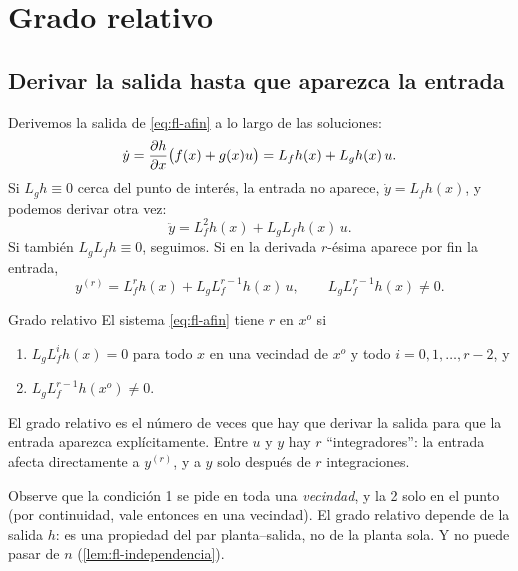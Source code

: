 \section{Grado relativo}
\label{sec:fl-grado}

\subsection{Derivar la salida hasta que aparezca la entrada}

Derivemos la salida de \eqref{eq:fl-afin} a lo largo de las soluciones:
\[
  \dot y=\frac{\partial h}{\partial x}\bigl(f(x)+g(x)u\bigr)=L_fh(x)+L_gh(x)\,u .
\]
Si $L_gh\equiv0$ cerca del punto de interés, la entrada no aparece, $\dot y=L_fh(x)$, y podemos derivar otra vez:
\[
  \ddot y=L_f^2h(x)+L_gL_fh(x)\,u .
\]
Si también $L_gL_fh\equiv0$, seguimos. Si en la derivada $r$-ésima aparece por fin la entrada,
\begin{equation}
  y^{(r)}=L_f^rh(x)+L_gL_f^{r-1}h(x)\,u,\qquad L_gL_f^{r-1}h(x)\neq0 .
  \label{eq:fl-yr}
\end{equation}

\begin{definicion}[label=def:fl-grado]{Grado relativo \citep[\S4.1]{Isi95}}
El sistema \eqref{eq:fl-afin} tiene  $r$ en $x^o$ si
\begin{enumerate}
  \item $L_gL_f^ih(x)=0$ para todo $x$ en una vecindad de $x^o$ y todo $i=0,1,\dots,r-2$, y
  \item $L_gL_f^{r-1}h(x^o)\neq0$.
\end{enumerate}
\end{definicion}

\begin{ideaclave}
El grado relativo es el número de veces que hay que derivar la salida para que la entrada aparezca explícitamente. Entre $u$ y $y$ hay $r$ ``integradores'': la entrada afecta directamente a $y^{(r)}$, y a $y$ solo después de $r$ integraciones.
\end{ideaclave}

Observe que la condición 1 se pide en toda una \emph{vecindad}, y la 2 solo en el punto (por continuidad, vale entonces en una vecindad). El grado relativo depende de la salida $h$: es una propiedad del par planta--salida, no de la planta sola. Y no puede pasar de $n$ (\cref{lem:fl-independencia}).

